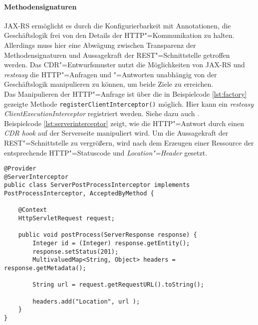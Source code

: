 \paragraph{Methodensignaturen}
\ac{JAX-RS} ermöglicht es durch die Konfigurierbarkeit mit Annotationen, die Geschäftslogik frei von den Details der \ac{HTTP}"=Kommunikation zu halten.
Allerdings muss hier eine Abwägung zwischen Transparenz der Methodensignaturen und Aussagekraft der \ac{REST}"=Schnittstelle getroffen werden.
Das \ac{CDR}"=Entwurfsmuster nutzt die Möglichkeiten von \ac{JAX-RS} und \textit{resteasy} die \ac{HTTP}"=Anfragen und "=Antworten unabhängig von der Geschäftslogik manipulieren zu können, um beide Ziele zu erreichen.\\
Das Manipulieren der \ac{HTTP}"=Anfrage ist über die in Beispielcode \ref{lst:factory} gezeigte Methode \colorbox{mygray}{\lstinline!registerClientInterceptor()!} möglich. Hier kann ein \textit{resteasy ClientExecutionInterceptor} registriert werden. Siehe dazu auch \cite{resteasy}.\\
Beispielcode \ref{lst:serverinterceptor} zeigt, wie die \ac{HTTP}"=Antwort durch einen \textit{CDR hook} auf der Serverseite manipuliert wird. Um die Aussagekraft der \ac{REST}"=Schnittstelle zu vergrößern, wird nach dem Erzeugen einer Ressource der entsprechende \ac{HTTP}"=Statuscode und \textit{Location"=Header} gesetzt. 
\begin{lstlisting}[caption={ServerPostProcessInterceptor},captionpos=b,label=lst:serverinterceptor] 
@Provider
@ServerInterceptor
public class ServerPostProcessInterceptor implements PostProcessInterceptor, AcceptedByMethod {	
	
	@Context
	HttpServletRequest request;
	
	public void postProcess(ServerResponse response) {
		Integer id = (Integer) response.getEntity();
		response.setStatus(201);
		MultivaluedMap<String, Object> headers = response.getMetadata();
		 
		String url = request.getRequestURL().toString();
		
		headers.add("Location", url );
	}
}
\end{lstlisting}

